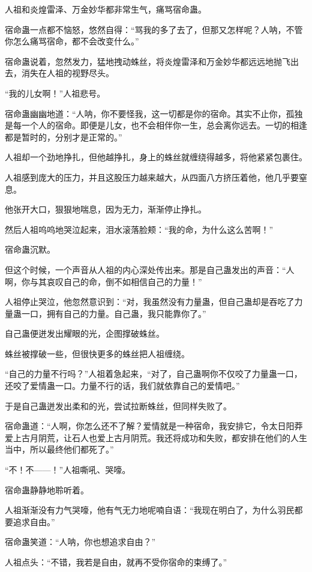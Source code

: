 \begin{this_body}
人祖和炎煌雷泽、万金妙华都非常生气，痛骂宿命蛊。

宿命蛊一点都不恼怒，悠然自得：“骂我的多了去了，但那又怎样呢？人呐，不管你怎么痛骂宿命，都不会改变什么。”

宿命蛊说着，忽然发力，猛地拽动蛛丝，将炎煌雷泽和万金妙华都远远地抛飞出去，消失在人祖的视野尽头。

“我的儿女啊！”人祖悲号。

宿命蛊幽幽地道：“人呐，你不要怪我，这一切都是你的宿命。其实不止你，孤独是每一个人的宿命。即便是儿女，也不会相伴你一生，总会离你远去。一切的相逢都是暂时的，分别才是正常的。”

人祖却一个劲地挣扎，但他越挣扎，身上的蛛丝就缠绕得越多，将他紧紧包裹住。

人祖感到庞大的压力，并且这股压力越来越大，从四面八方挤压着他，他几乎要窒息。

他张开大口，狠狠地喘息，因为无力，渐渐停止挣扎。

然后人祖呜呜地哭泣起来，泪水滚落脸颊：“我的命，为什么这么苦啊！”

宿命蛊沉默。

但这个时候，一个声音从人祖的内心深处传出来。那是自己蛊发出的声音：“人啊，你与其哀叹自己的命，倒不如相信自己的力量！”

人祖停止哭泣，他忽然意识到：“对，我虽然没有力量蛊，但自己蛊却是吞吃了力量蛊一口，拥有自己的力量。自己蛊，我只能靠你了。”

自己蛊便迸发出耀眼的光，企图撑破蛛丝。

蛛丝被撑破一些，但很快更多的蛛丝把人祖缠绕。

“自己的力量不行吗？”人祖着急起来，“对了，自己蛊啊你不仅咬了力量蛊一口，还咬了爱情蛊一口。力量不行的话，我们就依靠自己的爱情吧。”

于是自己蛊迸发出柔和的光，尝试拉断蛛丝，但同样失败了。

宿命蛊道：“人啊，你怎么还不了解？爱情就是一种宿命，我安排它，令太日阳莽爱上古月阴荒，让石人也爱上古月阴荒。我还将成功和失败，都安排在他们的人生当中，所以最终他们都死了。”

“不！不——！”人祖嘶吼、哭嚎。

宿命蛊静静地聆听着。

人祖渐渐没有力气哭嚎，他有气无力地呢喃自语：“我现在明白了，为什么羽民都要追求自由。”

宿命蛊笑道：“人呐，你也想追求自由？”

人祖点头：“不错，我若是自由，就再不受你宿命的束缚了。”


\end{this_body}
